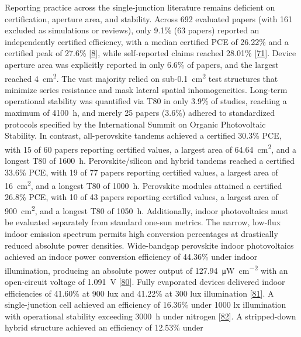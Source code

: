 \documentclass[
  11pt,
]{article}
\begin{document}
Reporting practice across the single-junction literature remains
deficient on certification, aperture area, and stability. Across 692
evaluated papers (with 161 excluded as simulations or reviews), only
9.1\% (63 papers) reported an independently certified efficiency, with a
median certified PCE of 26.22\% and a certified peak of 27.6\%
{[}\href{https://doi.org/10.1126/science.aeb9953}{8}{]}, while
self-reported claims reached 28.01\%
{[}\href{https://doi.org/10.1002/adma.202519339}{71}{]}. Device aperture
area was explicitly reported in only 6.6\% of papers, and the largest
reached \qty{4}{\centi\meter\squared}. The vast majority relied on
sub-\qty{0.1}{\centi\meter\squared} test structures that minimize series
resistance and mask lateral spatial inhomogeneities. Long-term
operational stability was quantified via T80 in only 3.9\% of studies,
reaching a maximum of \qty{4100}{\hour}, and merely 25 papers (3.6\%)
adhered to standardized protocols specified by the International Summit
on Organic Photovoltaic Stability. In contrast, all-perovskite tandems
achieved a certified 30.3\% PCE, with 15 of 60 papers reporting
certified values, a largest area of \qty{64.64}{\centi\meter\squared},
and a longest T80 of \qty{1600}{\hour}. Perovskite/silicon and hybrid
tandems reached a certified 33.6\% PCE, with 19 of 77 papers reporting
certified values, a largest area of \qty{16}{\centi\meter\squared}, and
a longest T80 of \qty{1000}{\hour}. Perovskite modules attained a
certified 26.8\% PCE, with 10 of 43 papers reporting certified values, a
largest area of \qty{900}{\centi\meter\squared}, and a longest T80 of
\qty{1050}{\hour}. Additionally, indoor photovoltaics must be evaluated
separately from standard one-sun metrics. The narrow, low-flux indoor
emission spectrum permits high conversion percentages at drastically
reduced absolute power densities. Wide-bandgap perovskite indoor
photovoltaics achieved an indoor power conversion efficiency of 44.36\%
under indoor illumination, producing an absolute power output of
\qty{127.94}{\micro\watt\per\centi\meter\squared} with an open-circuit
voltage of \qty{1.091}{\volt}
{[}\href{https://doi.org/10.1007/s40820-026-02225-5}{80}{]}. Fully
evaporated devices delivered indoor efficiencies of 41.60\% at 900 lux
and 41.22\% at 300 lux illumination
{[}\href{https://doi.org/10.1002/smtd.70654}{81}{]}. A single-junction
cell achieved an efficiency of 16.36\% under 1000 lx illumination with
operational stability exceeding \qty{3000}{\hour} under nitrogen
{[}\href{https://doi.org/10.1021/acsenergylett.5c04174}{82}{]}. A
stripped-down hybrid structure achieved an efficiency of 12.53\% under
\end{document}
